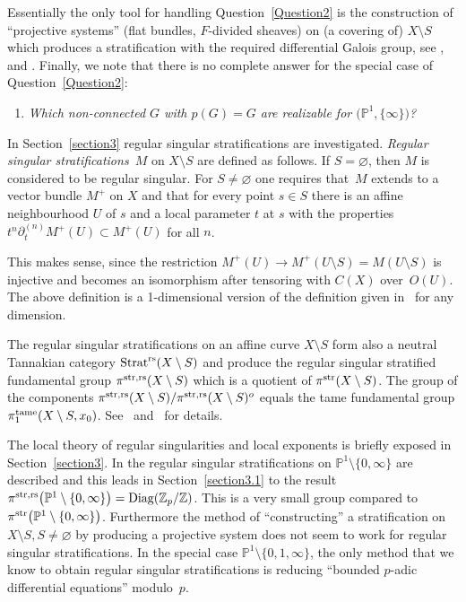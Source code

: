 \documentclass[pdftex]{sigma}
\numberwithin{equation}{section}
\begin{document}
Essentially the only tool for handling Question~\ref{Question2} is the construction of ``projective systems'' (flat bundles, $F$-divided sheaves) on (a covering of) $X\setminus S$ which produces a stratification with the required differential Galois group, see \cite[Theorem~1.3]{Gie}, \cite[Proposition~5.1]{Ma-vdP1} and \cite[Theorem~8]{Sa}. Finally, we note that there is no complete answer for the special case of Question~\ref{Question2}:
\begin{enumerate}\itemsep=0pt
\item[]{\it Which non-connected $G$ with $p(G)=G$ are realizable for $\big(\mathbb{P}^1,\{\infty \}\big)$?}
\end{enumerate}

In Section~\ref{section3} regular singular stratifications are investigated. {\it Regular singular stratifications}~$M$ on $X\setminus S$ are defined as follows. If $S=\varnothing$, then $M$ is considered to be regular singular. For $S\neq \varnothing$ one requires that~$M$ extends to a vector bundle $M^+$ on $X$ and that for every point $s\in S$ there is an affine neighbourhood $U$ of $s$ and a local parameter $t$ at $s$ with the properties $t^n\partial _t^{(n)}M^+(U)\subset M^+(U)$ for all $n$.

This makes sense, since the restriction $M^+(U)\rightarrow M^+(U\setminus S)=M(U\setminus S)$ is injective and becomes an isomorphism after tensoring with $C(X)$ over~$O(U)$.
 The above definition is a 1-dimensional version of the definition given in~\cite{Gie} for any dimension.

The regular singular stratifications on an affine curve $X\setminus S$ form also a neutral Tannakian ca\-tegory $\operatorname{Strat}^{\rm rs}(X\setminus S)$ and produce the regular singular stratified fundamental group \mbox{$\pi^{\rm str,rs}(X\setminus S)$} which is a quotient of $\pi^{\rm str}(X\setminus S)$. The group of the components
$\pi^{\rm str,rs}(X\setminus S)/\pi^{\rm str,rs}(X\setminus S)^o$ equals the tame fundamental group $\pi_1^{\rm tame}(X\setminus S,x_0)$. See~\cite{K} and~\cite{Ki} for details.

The local theory of regular singularities and local exponents is briefly exposed in Section~\ref{section3}. In \cite{Gie} the regular singular stratifications on $\mathbb{P}^1\setminus \{0,\infty \}$ are described and this leads in Section~\ref{section3.1} to the result $\pi^{\rm str,rs}\big(\mathbb{P}^1\setminus \{0,\infty\}\big)=\operatorname{Diag}(\mathbb{Z}_p/\mathbb{Z})$. This is a very small group compared to $\pi^{\rm str}\big(\mathbb{P}^1\setminus \{0,\infty\}\big)$. Furthermore the method of ``constructing'' a stratification on $X\setminus S, S\neq \varnothing$ by producing a projective system does not seem to work for regular singular stratifications.
In the special case $\mathbb{P}^1\setminus \{0,1,\infty\}$, the only method that we know to obtain regular singular stratifications is reducing ``bounded $p$-adic differential equations'' modulo~$p$.
\end{document}
